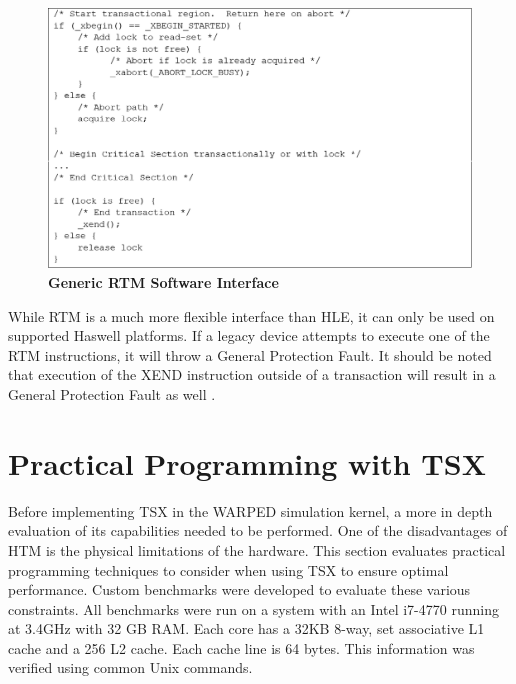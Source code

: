\documentclass[a4paper]{article}
\begin{document}
\begin{figure}[H]
    \centering
    \graphicspath{ {./figures/} }
    \includegraphics[width=\textwidth,height=\textheight,keepaspectratio]{fig_rtmInterface}
    \caption{\textbf{Generic RTM Software Interface}}
    \label{fig:rtm_interface}
\end{figure}

\indent 
While RTM is a much more flexible interface than HLE, it can only be
used on supported Haswell platforms.  If a legacy device attempts to execute one
of the RTM instructions, it will throw a General Protection Fault.  It should
be noted that execution of the XEND instruction outside of a transaction
will result in a General Protection Fault as well \cite{intel_opt_man}.
\par

\newpage
\section{\textbf{Practical Programming with TSX}}

\indent 
Before implementing TSX in the WARPED simulation kernel, a more in depth
evaluation of its capabilities needed to be performed.  One of the disadvantages
of HTM is the physical limitations of the hardware.  This section evaluates
practical programming techniques to consider when using TSX to ensure optimal
performance.  Custom benchmarks were developed to evaluate these various
constraints.  All benchmarks were run on a system with an Intel i7-4770 running
at 3.4GHz with 32 GB RAM.  Each core has a 32KB 8-way, set associative L1 cache
and a 256 L2 cache.  Each cache line is 64 bytes.  This information was verified
using common Unix commands.
\par
\end{document}
